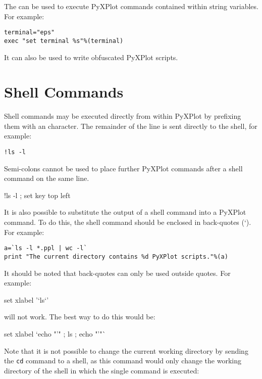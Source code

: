 The  can be used to execute PyXPlot commands contained within
string variables. For example:

\begin{verbatim}
terminal="eps"
exec "set terminal %s"%(terminal)
\end{verbatim}

It can also be used to write obfuscated PyXPlot scripts.

\section{Shell Commands}

Shell commands may be executed directly from
within PyXPlot by prefixing them with an \indcmdts{!} character. The
remainder of the line is sent directly to the shell, for example:

\begin{verbatim}
!ls -l
\end{verbatim}

\noindent Semi-colons cannot be used to place further PyXPlot commands after a
shell command on the same line.

\begin{dontdo}
!ls -l ; set key top left
\end{dontdo}

It is also possible to substitute the output of a shell command into a PyXPlot
command. To do this, the shell command should be enclosed in back-quotes (`).
For example:

\begin{verbatim}
a=`ls -l *.ppl | wc -l`
print "The current directory contains %d PyXPlot scripts."%(a)
\end{verbatim}

It should be noted that back-quotes can only be used outside quotes. For
example:

\begin{dontdo}
set xlabel '`ls`'
\end{dontdo}

\noindent will not work. The best way to do this would be:

\begin{dodo}
set xlabel `echo "'" ; ls ; echo "'"`
\end{dodo}

Note that it is not possible to change the current working directory by sending
the {\tt cd} command to a shell, as this command would only change the working
directory of the shell in which the single command is executed:

